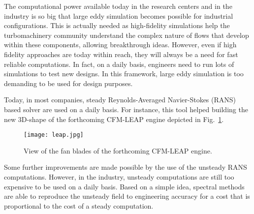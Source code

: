 
The computational power available today in
the research centers and in the industry
is so big that large eddy simulation
becomes possible for industrial configurations.
This is actually needed as high-fidelity
simulations help the turbomachinery community understand
the complex nature of flows that develop 
within these components,
allowing breakthrough ideas.
However, even if high fidelity approaches
are today within reach,
they will always be a need for fast reliable
computations. 
In fact, on a daily basis, engineers need
to run lots of simulations to test new designs.
In this framework, large eddy simulation is
too demanding to be used for design purposes.

Today, in most companies, steady Reynolds-Averaged
Navier-Stokes (RANS) based solver are used on a daily basis.
For instance, this tool 
helped building the new $3$D-shape
of the forthcoming CFM-LEAP engine
depicted in Fig.~\ref{fig:sm_leap}.
\begin{figure}[htbp]
  \centering
  \texttt{[image: leap.jpg]}
  \caption{View of the fan blades of the forthcoming CFM-LEAP engine.}
  \label{fig:sm_leap}
\end{figure}
Some further improvements are made possible by the use
of the unsteady RANS computations.
However, in the industry, unsteady computations
are still too expensive to be used on a daily basis.
Based on a simple idea, spectral methods are 
able to reproduce the unsteady field to engineering
accuracy for a cost that is proportional to the
cost of a steady computation.

